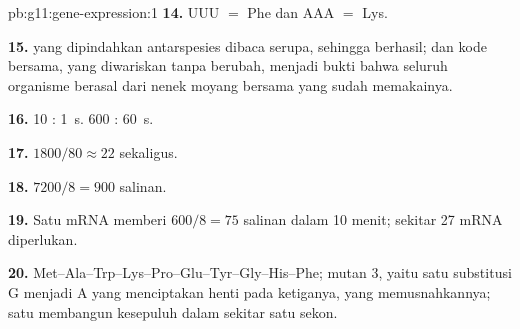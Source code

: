 \begin{solution}{pb:g11:gene-expression:1}
\textbf{14.} UUU $=$ Phe dan AAA $=$ Lys.

\textbf{15.}  yang dipindahkan antarspesies dibaca serupa, sehingga
 berhasil; dan kode bersama, yang diwariskan tanpa berubah,
menjadi bukti bahwa seluruh organisme berasal dari nenek moyang bersama
yang sudah memakainya.

\textbf{16.} 10 : \qty{1}{s}. 600 : \qty{60}{s}.

\textbf{17.} $1800/80 \approx 22$  sekaligus.

\textbf{18.} $7200/8 = 900$ salinan.

\textbf{19.} Satu mRNA memberi $600/8 = 75$ salinan dalam 10 menit;
sekitar 27 mRNA diperlukan.

\textbf{20.} 
Met--Ala--Trp--Lys--Pro--Glu--Tyr--Gly--His--Phe; mutan 3, yaitu satu
substitusi G menjadi A yang menciptakan henti pada  ketiganya,
yang memusnahkannya; satu  membangun kesepuluh 
dalam sekitar satu sekon.
\end{solution}
